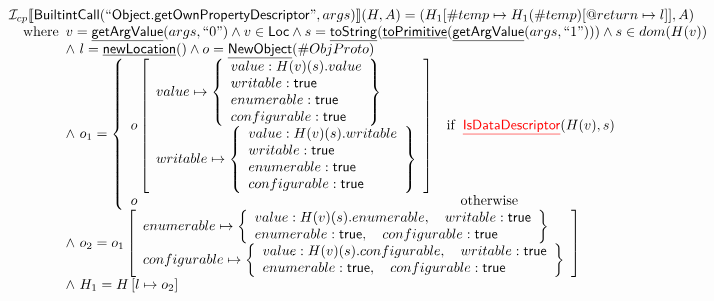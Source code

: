 \documentclass{article}
\newcommand{\SF}[1]{\mbox{\textsf{#1}}}
\newcommand{\wherec}[1]{{\rm where}\begin{array}[t]{l}#1\end{array}}
\newcommand{\ifc}[1]{{\rm if}\begin{array}[t]{l}#1\end{array}}
\newcommand{\owc}{{\rm otherwise}}
\newcommand{\Loc}{\SF{Loc}}
\newcommand{\I}{\mathcal{I}}
\newcommand{\lbr}{\llbracket}
\newcommand{\rbr}{\rrbracket}
\newcommand{\hf}[1]{\underline{\sf #1}}
\def\inred{\color{red}}
\def\inred{\color{red}}
\begin{document}
\[\begin{array}{l}
\I _{cp}\lbr \SF{BuiltintCall}(``\SF{Object.getOwnPropertyDescriptor}",args)\rbr(H,A)
 = (H_1[\#temp \mapsto H_1(\#temp)[@return \mapsto l]], A)\\
  \quad\wherec{
  v = \hf{getArgValue}(args, ``0") \land v \in\Loc
  \land s = \hf{toString}(\hf{toPrimitive}(\hf{getArgValue}(args,``1"))) \land s \in dom(H(v))\\
  \land\ l=\hf{newLocation}() \land o=\hf{NewObject}(\#ObjProto)\\
  \land\ o_1 = \left\{
    \begin{array}{ll}
      o\left[
      \begin{array}{l}
        value \mapsto \left\{
        \begin{array}{l}
          value: H(v)(s).value\\
          writable: \SF{true} \\
          enumerable: \SF{true}\\
          configurable: \SF{true} \\
        \end{array}
        \right\}\\
        writable \mapsto \left\{
        \begin{array}{l}
          value: H(v)(s).writable\\
          writable: \SF{true} \\
          enumerable: \SF{true}\\
          configurable: \SF{true} \\
        \end{array}
        \right\}\\
      \end{array}\right] & \ifc{\hf{\inred IsDataDescriptor}(H(v),s)}\\
      o  & \quad\owc
    \end{array}\right.\\
  \land\ o_2 = o_1\left[
    \begin{array}{l}
      enumerable \mapsto \left\{
        \begin{array}{l}
          value: H(v)(s).enumerable, \quad writable: \SF{true} \\
          enumerable: \SF{true}, \quad configurable: \SF{true} \\
        \end{array}
        \right\}\\
      configurable \mapsto \left\{
        \begin{array}{l}
          value: H(v)(s).configurable, \quad writable: \SF{true} \\
          enumerable: \SF{true}, \quad configurable: \SF{true} \\
        \end{array}
        \right\}\\
    \end{array}\right]\\
  \land\ H_1=H\left[l\mapsto o_2\right]}\\
\\\\




\end{array}\]
\end{document}
